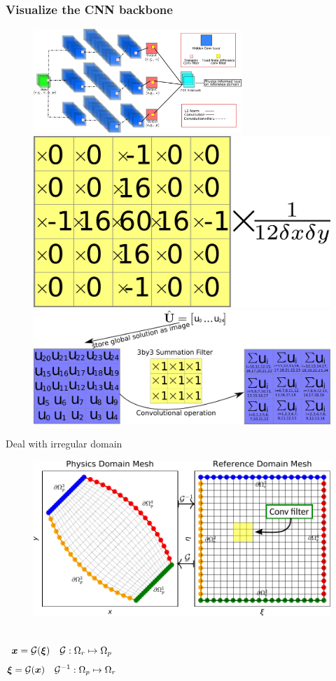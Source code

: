 \documentclass{beamer}
\begin{document}
\begin{frame}
\frametitle{Visualize the CNN backbone}
\begin{figure}
\includegraphics[width=0.7\textwidth]{CNN.pdf}
\vfill
\includegraphics[height=0.2\textwidth]{laplaceU.pdf}
\hfill
\includegraphics[height=0.2\textwidth]{WhatIsCNN.pdf}
\end{figure}
\end{frame}

\begin{frame}{Deal with irregular domain}
\begin{figure}
\includegraphics[width=1\textwidth]{PhyGeoCNN}
\end{figure}
\begin{columns}[c]
\begin{equation*}
{\ensuremath{\bm{x}}}=\mathcal{G}({\boldsymbol{\xi}})\quad \mathcal{G}:\Omega_{r}\mapsto\Omega_{p}
\end{equation*}
\begin{equation*}
{\ensuremath{\boldsymbol{\xi}}}=\mathcal{G}({\bm{x}})\quad \mathcal{G}^{-1}:\Omega_{p}\mapsto\Omega_{r}
\end{equation*}
\end{columns}
\end{frame}
\end{document}
